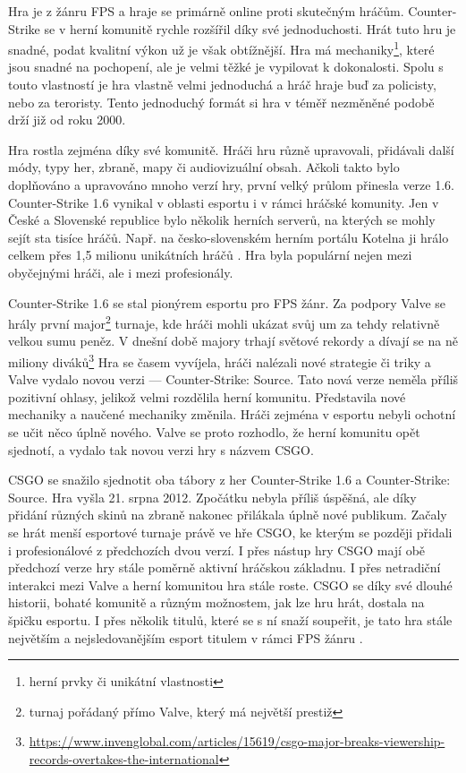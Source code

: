 Hra je z žánru \ac{FPS} a hraje se primárně online proti skutečným hráčům. Counter-Strike se v herní komunitě rychle rozšířil díky své jednoduchosti.
Hrát tuto hru je snadné, podat kvalitní výkon už je však obtížnější. Hra má mechaniky\footnote{herní prvky či unikátní vlastnosti},
které jsou snadné na pochopení, ale je velmi těžké je vypilovat k dokonalosti. Spolu s touto vlastností je hra vlastně velmi jednoduchá a hráč hraje buď za policisty, nebo za
teroristy. Tento jednoduchý formát si hra v téměř nezměněné podobě drží již od roku 2000.

Hra rostla zejména díky své komunitě. Hráči hru různě upravovali, přidávali další módy, typy her, zbraně, mapy či audiovizuální obsah. Ačkoli takto bylo doplňováno a upravováno
mnoho verzí hry,  první velký průlom přinesla verze 1.6. Counter-Strike 1.6 vynikal v oblasti esportu i v rámci hráčské komunity. Jen v České a Slovenské republice bylo několik
herních serverů, na kterých se mohly sejít sta tisíce hráčů. Např. na česko-slovenském herním portálu Kotelna ji hrálo celkem přes 1,5 milionu unikátních hráčů
\cite{cskocs_kotelna_2022}. Hra byla populární nejen mezi obyčejnými hráči, ale i mezi profesionály.

Counter-Strike 1.6 se stal pionýrem esportu pro \ac{FPS} žánr. Za podpory Valve se hrály první major\footnote{turnaj pořádaný přímo Valve, který má největší prestiž} turnaje,
kde hráči mohli ukázat svůj um za tehdy relativně velkou sumu peněz. V dnešní době majory trhají světové rekordy a dívají se na ně miliony
diváků\footnote{\scriptsize \url{https://www.invenglobal.com/articles/15619/csgo-major-breaks-viewership-records-overtakes-the-international}}
Hra se časem vyvíjela, hráči nalézali nové strategie či triky a Valve vydalo novou verzi ---  Counter-Strike: Source. Tato nová verze neměla příliš pozitivní ohlasy,
jelikož velmi rozdělila herní komunitu. Představila nové mechaniky a naučené mechaniky změnila. Hráči zejména v esportu nebyli ochotní se učit něco úplně nového. Valve se proto
rozhodlo, že herní komunitu opět sjednotí, a vydalo tak novou verzi hry s názvem \ac{CSGO}.

\ac{CSGO} se snažilo sjednotit oba tábory z her 
Counter-Strike 1.6 a Counter-Strike: Source. Hra vyšla 21. srpna 2012. Zpočátku nebyla příliš úspěšná, ale díky přidání různých
skinů \cite{valve_counterstrike_2013} na zbraně nakonec přilákala úplně nové publikum. Začaly se hrát menší esportové turnaje právě ve hře \ac{CSGO}, ke kterým se
později přidali i profesionálové z předchozích dvou verzí. I přes nástup hry \ac{CSGO} mají obě předchozí verze hry stále poměrně aktivní hráčskou základnu. I přes netradiční
interakci mezi Valve a herní komunitou hra stále roste. \ac{CSGO} se díky své dlouhé historii, bohaté komunitě a různým možnostem, jak lze hru hrát, dostala na špičku
esportu. I přes několik titulů, které se s ní snaží soupeřit, je tato hra stále největším a nejsledovanějším esport titulem v rámci \ac{FPS} žánru \cite{henningson_history_2020}.

